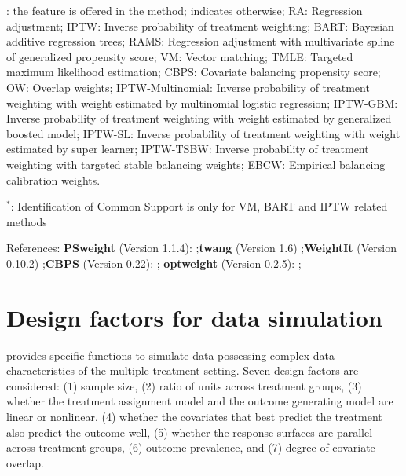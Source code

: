 \begin{table}[h]
\begin{tabular}{lcccccc}
\bottomrule
\end{tabular}
\begin{tablenotes}
\footnotesize \item \cmark: the feature is offered in the method; \xmark\; indicates otherwise; RA: Regression adjustment; IPTW: Inverse probability of treatment weighting; BART: Bayesian additive regression trees; RAMS: Regression adjustment with multivariate spline of generalized propensity score; VM: Vector matching; TMLE: Targeted maximum likelihood estimation; CBPS: Covariate balancing propensity score; OW: Overlap weights; IPTW-Multinomial: Inverse probability of treatment weighting with weight estimated by multinomial logistic regression; IPTW-GBM: Inverse probability of treatment weighting with weight estimated by generalized boosted model; IPTW-SL: Inverse probability of treatment weighting with weight estimated by super learner; IPTW-TSBW: Inverse probability of treatment weighting with targeted stable balancing weights; EBCW: Empirical balancing calibration weights.
\item $^\ast$: Identification of Common Support is only for VM, BART and IPTW related methods
\item References: \textbf{PSweight} (Version 1.1.4): \cite{PSweight};\textbf{twang} (Version 1.6) \cite{twang};\textbf{WeightIt}  (Version 0.10.2) \cite{WeightIt};\textbf{CBPS} (Version 0.22): \cite{CBPS};  \textbf{optweight} (Version 0.2.5): \cite{optweight};
\end{tablenotes}
\vspace{-0.05in}
\end{table}

\section{Design factors for data simulation}\label{sec:simulation}
 provides specific functions to simulate data possessing complex data characteristics of the multiple treatment setting. Seven design factors are considered: (1) sample size, (2) ratio of units across treatment groups,  (3) whether the treatment assignment model and the outcome generating model are linear or nonlinear,  (4) whether the covariates that best predict the treatment also predict the outcome well, (5) whether the response surfaces are parallel across treatment groups, (6) outcome prevalence, and (7) degree of covariate overlap. 


